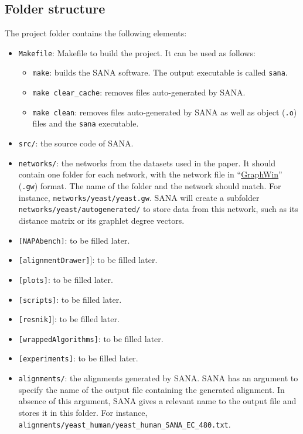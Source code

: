 \documentclass[]{article}
\begin{document}
\subsection{Folder structure}\label{b:struct}
The project folder contains the following elements:
\begin{itemize}
\item\verb|Makefile|: Makefile to build the project. It can be used as follows:
\begin{itemize}
\item\verb|make|: builds the SANA software. The output executable is called \verb|sana|.
\item\verb|make clear_cache|: removes files auto-generated by SANA. 
\item\verb|make clean|: removes files auto-generated by SANA as well as object (\verb|.o|) files and the \verb|sana| executable.
\end{itemize}
\item\verb|src/|: the source code of SANA.
\item\verb|networks/|: the networks from the datasets used in the paper. It should contain one folder for each network, with the network file in ``\href{http://www.algorithmic-solutions.info/leda_manual/gw.html}{GraphWin}'' (\verb'.gw') format. The name of the folder and the network should match. For instance, \verb|networks/yeast/yeast.gw|. SANA will create a subfolder\\ \verb|networks/yeast/autogenerated/| to store data from this network, such as its distance matrix or its graphlet degree vectors.
\item\verb|[NAPAbench]|: to be filled later.
\item\verb|[alignmentDrawer]|]: to be filled later.
\item\verb|[plots]|: to be filled later.
\item\verb|[scripts]|: to be filled later.
\item\verb|[resnik]|]: to be filled later.
\item\verb|[wrappedAlgorithms]|: to be filled later.
\item\verb|[experiments]|: to be filled later.
\item\verb|alignments/|: the alignments generated by SANA. SANA has an argument to specify the name of the output file containing the generated alignment. In absence of this argument, SANA gives a relevant name to the output file and stores it in this folder. For instance,\\ \verb|alignments/yeast_human/yeast_human_SANA_EC_480.txt|.

\end{itemize}
\end{document}
